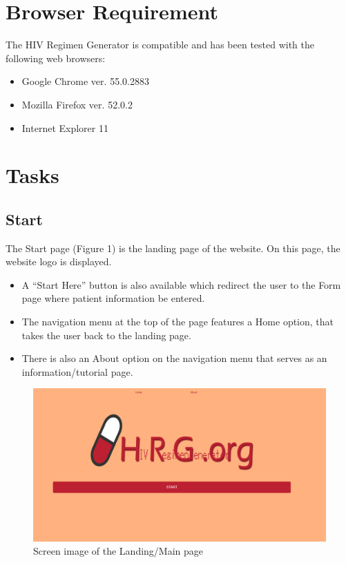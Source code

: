 \documentclass[12pt]{article}
\begin{document}
\section{Browser Requirement}
The HIV Regimen Generator is compatible and has been tested with the following web browsers:
\begin{itemize}
	\item Google Chrome ver. 55.0.2883
	\item Mozilla Firefox ver. 52.0.2
	\item Internet Explorer 11
\end{itemize}

\section{Tasks}
\subsection{Start}

The Start page (Figure 1) is the landing page of the website. On this page, the website logo is displayed. 

\begin{itemize}
	\item A “Start Here” button is also available which redirect the user to the Form page where patient information be entered.
	\item  The navigation menu at the top of the page features a Home option, that takes the user back to the landing page.
	\item There is also an About option on the navigation menu that serves as an information/tutorial page.
\end{itemize} 

\begin{figure}[H]
  \centering
  \includegraphics[width=\linewidth]{landing.png}
 \caption{Screen image of the Landing/Main page}
  \label{fig:landing}
\end{figure}
\end{document}
